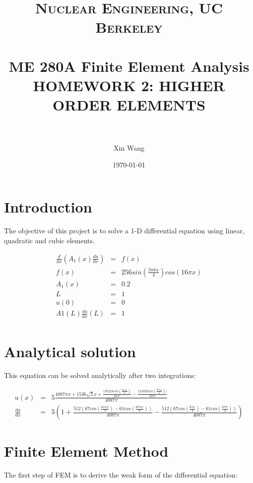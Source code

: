\documentclass[paper=a4, fontsize=11pt]{article} %
\title{	
\normalfont \normalsize 
\textsc{Nuclear Engineering, UC Berkeley} \\ [25pt] %
\horrule{0.5pt} \\[0.4cm] %
\huge ME 280A Finite Element Analysis \\HOMEWORK 2: HIGHER ORDER ELEMENTS  \\  %
\horrule{2pt} \\[0.5cm] %
}
\author{Xin Wang} %
\date{\normalsize\today} %
\begin{document}
\maketitle %

\newpage
\section{Introduction}
The objective of this project is to solve a 1-D differential equation using linear, quadratic and cubic elements. 

\begin{eqnarray}
\frac{d}{dx}(A_1(x) \frac{du}{dx}) &=& f(x)\nonumber\\
f(x)&=&256sin(\frac{3\pi kx}{4})cos(16 \pi x) \nonumber\\
A_1(x)& = &0.2 \nonumber\\
L&=&1 \nonumber\\
u(0)& =& 0 \nonumber\\
A1(L)\frac{du}{dx}(L) &=& 1 \nonumber\\
\end{eqnarray}


\section{Analytical solution}
This equation can be solved analytically after two integrations:

\begin{eqnarray}
u(x)&=& 5\frac{4087\pi x + 1536\sqrt{2}x + \frac{137216sin(\frac{61\pi x}{4})}{61\pi}- \frac{124928sin(\frac{67\pi x}{4}))}{67\pi}}{4087\pi}\nonumber\\
\frac{du}{dx}&=& 5(1+ \frac{512(67cos(\frac{61\pi x}{4})- 61cos(\frac{67\pi x}{4}))}{4087\pi} - \frac{512(67cos(\frac{61\pi }{4})- 61cos(\frac{67\pi}{4}))}{4087\pi})
\end{eqnarray}





\section{Finite Element Method}
The first step of FEM is to derive the weak form of the differential equation: 
\end{document}
